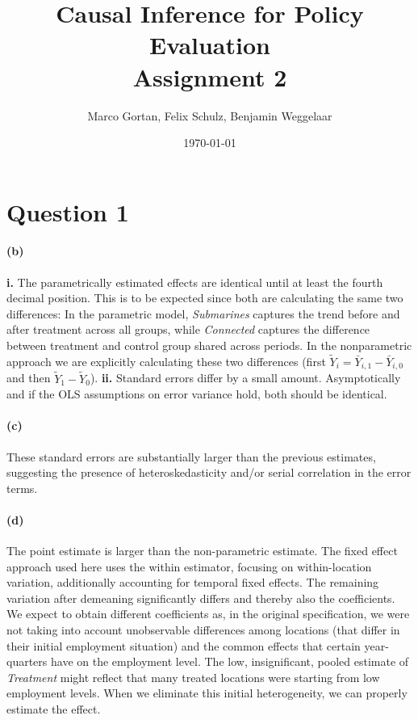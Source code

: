 \documentclass{scrartcl}
\title{Causal Inference for Policy Evaluation\\
\Large{Assignment 2}}
\author{Marco Gortan, Felix Schulz, Benjamin Weggelaar}
\date{\today}
\begin{document}
\maketitle

\section*{Question 1}



\paragraph*{(b)}

\textbf{i.} The parametrically estimated effects are identical until at least the fourth decimal position. This is to be expected since both are calculating the same two differences: In the parametric model, \textit{Submarines} captures the trend before and after treatment across all groups, while \textit{Connected} captures the difference between treatment and control group shared across periods. In the nonparametric approach we are explicitly calculating these two differences (first $\tilde{Y}_i = \bar{Y}_{i,1} - \bar{Y}_{i,0}$ and then $\tilde{Y}_1 - \tilde{Y}_0$).
\textbf{ii.} Standard errors differ by a small amount. Asymptotically and if the OLS assumptions on error variance hold, both should be identical.




\paragraph*{(c)} These standard errors are substantially larger than the previous estimates, suggesting the presence of heteroskedasticity and/or serial correlation in the error terms.

\paragraph*{(d)} The point estimate is larger than the non-parametric estimate. The fixed effect approach used here uses the within estimator, focusing on within-location variation, additionally accounting for temporal fixed effects. The remaining variation after demeaning significantly differs and thereby also the coefficients. We expect to obtain different coefficients as, in the original specification, we were not taking into account unobservable differences among locations (that differ in their initial employment situation) and the common effects that certain year-quarters have on the employment level. The low, insignificant, pooled estimate of \textit{Treatment} might reflect that many treated locations were starting from low employment levels. When we eliminate this initial heterogeneity, we can properly estimate the effect.   
\end{document}
